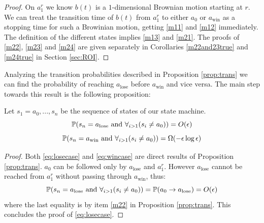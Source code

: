 {\begin{proof}
 On $a^r_1$ we know $b(t)$ is a $1$-dimensional Brownian motion starting at $r$.
 We can treat the transition time of $b(t)$ from $a^r_1$ to either $a_0$ or
 $a_\text{win}$ as a stopping time for such a Browinian motion, getting
 \ref{m11} and \ref{m12} immediately. The definition of the different states
 implies \ref{m13} and \ref{m21}. The proofs of \ref{m22}, \ref{m23} and \ref{m24}
 are given separately in Corollaries \ref{m22and23true} and \ref{m24true} in Section \ref{sec:ROI}.
\end{proof}

Analyzing the transition probabilities described in Proposition \ref{prop:trans} we
can find the probability of reaching $a_\text{lose}$ before $a_\text{win}$ and vice versa.
 The main step towards this result is the following proposition:

\begin{propos}\label{prop:winlose1}
Let $s_1=a_0,...,s_n$ be the sequence of states of our state machine.
\begin{equation}\label{eq:losecase}
\mathbb{P}(s_n=a_\text{lose} \text{ and } \displaystyle\forall_{i>1}(s_i\neq a_0))=O(\epsilon)
\end{equation}
\begin{equation}\label{eq:wincase}
\mathbb{P}(s_n=a_\text{win} \text{ and } \displaystyle\forall_{i>1}(s_i\neq a_0))=\Omega(-\epsilon\log\epsilon)
\end{equation}
\end{propos}

\begin{proof}
Both \eqref{eq:losecase} and \eqref{eq:wincase} are direct results of Proposition \ref{prop:trans}.
 $a_0$ can be followed only by $a_\text{lose}$ and $a_1^r$. However $a_\text{lose}$ cannot be
 reached from $a_1^r$ without passing through
 $a_\text{win}$, thus:
 $$\mathbb{P}(s_n=a_\text{lose} \text{ and } \displaystyle\forall_{i>1}(s_i\neq a_0))=\mathbb{P}(a_0\rightarrow a_\text{lose})=O(\epsilon)$$
 where the last equality is by item \ref{m22} in Proposition \ref{prop:trans}.
 This concludes the proof of \eqref{eq:losecase}.


\end{proof}}
